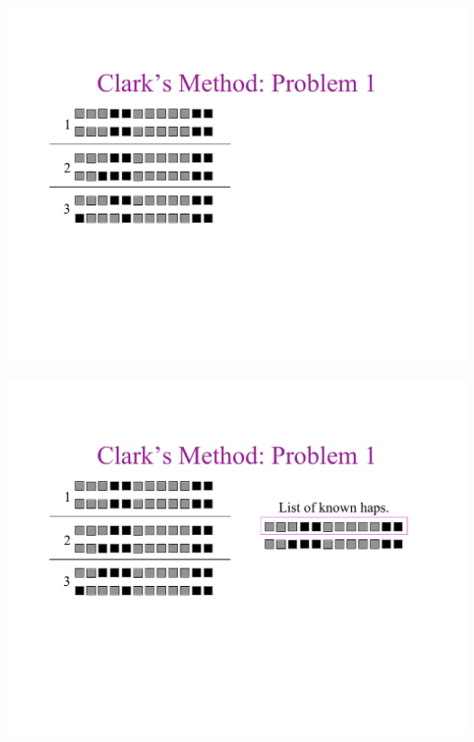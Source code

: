 \newslide{}
\mbox{}
\vspace*{\VertUp}
\enlargethispage*{1000pt}
\begin{center}
\includegraphics*[width=\textwidth]{PPT_pages/pg_0023.pdf}
\end{center}


\newslide{}
\mbox{}
\vspace*{\VertUp}
\enlargethispage*{1000pt}
\begin{center}
\includegraphics*[width=\textwidth]{PPT_pages/pg_0024.pdf}
\end{center}


